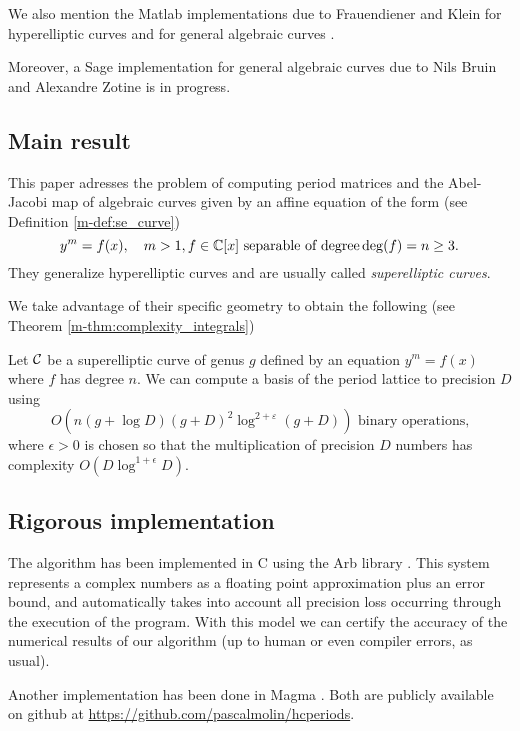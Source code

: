 \documentclass[main.tex]{subfiles}
\begin{document}
  We also mention the Matlab implementations due to Frauendiener and Klein for hyperelliptic curves \cite{FrauendienerKlein2015}
    and for general algebraic curves \cite{FrauendienerKlein2011}.
  
  Moreover, a Sage implementation for general algebraic curves due to Nils Bruin and Alexandre Zotine is in progress.
  
  \subsection{Main result}

  This paper adresses the problem of computing period matrices and the
  Abel-Jacobi map of algebraic curves given by an affine equation of the form  (see Definition \ref{m-def:se_curve})
  \begin{equation*}
  y^m = f(x), \quad m > 1, f \in \mathbb{C}[x] \text{ separable of degree} \operatorname{deg}(f) = n \ge 3.
  \end{equation*}
  They generalize
  hyperelliptic curves and are usually called \textit{superelliptic curves}.

  We take advantage of their specific geometry to obtain the following
  (see Theorem \ref{m-thm:complexity_integrals})
  \begin{thm}
      Let $\mathcal{C}$ be a superelliptic curve of genus $g$ defined by an equation $y^m=f(x)$
      where $f$ has degree $n$.
      We can compute a basis of the period lattice to
      precision $D$ using $$O(n(g+\log D)(g+D)^2\log^{2+\varepsilon} (g+D)) \text{ binary operations,}$$
      where $\epsilon>0$ is chosen so that
      the multiplication of precision $D$ numbers has complexity
      $O(D\log^{1+\epsilon}D)$.
  \end{thm}

  \subsection{Rigorous implementation}
  \label{subsec:arb}

  The algorithm has been implemented in C using the Arb library \cite{Johansson2013arb}.
  This system represents a complex numbers as a floating point approximation
  plus an error bound, and automatically
  takes into account all precision loss occurring through the
  execution of the program. With this model we can certify
  the accuracy of the numerical results of our algorithm (up to human or even
  compiler errors, as usual).

  Another implementation has been done in Magma \cite{Magma}. Both are publicly available
  on github at \url{https://github.com/pascalmolin/hcperiods}.
\end{document}
